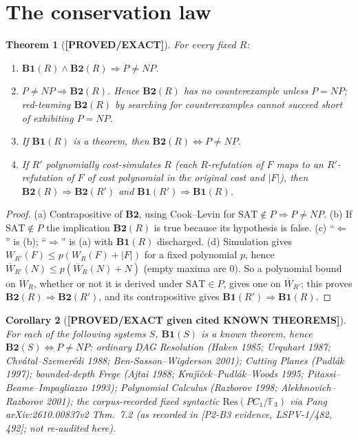 \documentclass[11pt]{article}
\newtheorem{theorem}{Theorem}
\newtheorem{corollary}[theorem]{Corollary}
\theoremstyle{remark}
\newcommand{\SAT}{\mathrm{SAT}}
\newcommand{\Wb}{\overline W}
\newcommand{\status}[1]{\textbf{[#1]}}
\begin{document}
\section{The conservation law}
\begin{theorem}[\status{PROVED/EXACT}]\label{thm:cons}
For every fixed $R$:
\begin{enumerate}
\item[(a)] $\mathbf{B1}(R)\wedge\mathbf{B2}(R)\Rightarrow P\neq NP$.
\item[(b)] $P\ne NP\Rightarrow\mathbf{B2}(R)$. Hence $\mathbf{B2}(R)$ has no counterexample unless
$P=NP$; red-teaming $\mathbf{B2}(R)$ by searching for counterexamples cannot succeed short of
exhibiting $P=NP$.
\item[(c)] If $\mathbf{B1}(R)$ is a theorem, then $\mathbf{B2}(R)\iff P\ne NP$.
\item[(d)] If $R'$ polynomially cost-simulates $R$ (each $R$-refutation of $F$ maps to an
$R'$-refutation of $F$ of cost polynomial in the original cost and $|F|$), then
$\mathbf{B2}(R)\Rightarrow\mathbf{B2}(R')$ and $\mathbf{B1}(R')\Rightarrow\mathbf{B1}(R)$.
\end{enumerate}
\end{theorem}
\begin{proof}
(a) Contrapositive of $\mathbf{B2}$, using Cook--Levin for $\SAT\notin P\Rightarrow P\ne NP$.
(b) If $\SAT\notin P$ the implication $\mathbf{B2}(R)$ is true because its hypothesis is false.
(c) ``$\Leftarrow$'' is (b); ``$\Rightarrow$'' is (a) with $\mathbf{B1}(R)$ discharged.
(d) Simulation gives $W_{R'}(F)\le p(W_R(F)+|F|)$ for a fixed polynomial $p$, hence
$\Wb_{R'}(N)\le p(\Wb_R(N)+N)$ (empty maxima are $0$). So a polynomial bound on $\Wb_R$, whether
or not it is derived under $\SAT\in P$, gives one on $\Wb_{R'}$; this proves
$\mathbf{B2}(R)\Rightarrow\mathbf{B2}(R')$, and its contrapositive gives
$\mathbf{B1}(R')\Rightarrow\mathbf{B1}(R)$.
\end{proof}

\begin{corollary}[\status{PROVED/EXACT given cited KNOWN THEOREMS}]\label{cor:known}
For each of the following systems $S$, $\mathbf{B1}(S)$ is a known theorem, hence
$\mathbf{B2}(S)\iff P\ne NP$: ordinary DAG Resolution (Haken 1985; Urquhart 1987;
Chv\'atal--Szemer\'edi 1988; Ben-Sasson--Wigderson 2001); Cutting Planes (Pudl\'ak 1997);
bounded-depth Frege (Ajtai 1988; Kraj\'{\i}\v{c}ek--Pudl\'ak--Woods 1995; Pitassi--Beame--Impagliazzo 1993);
Polynomial Calculus (Razborov 1998; Alekhnovich--Razborov 2001); the corpus-recorded fixed
syntactic $\mathrm{Res}(PC_1/\mathbb F_3)$ via Pang arXiv:2610.00837v2 Thm.\ 7.2 (as recorded in
[P2-B3 evidence, LSPV-1/482, 492]; not re-audited here).
\end{corollary}
\end{document}
